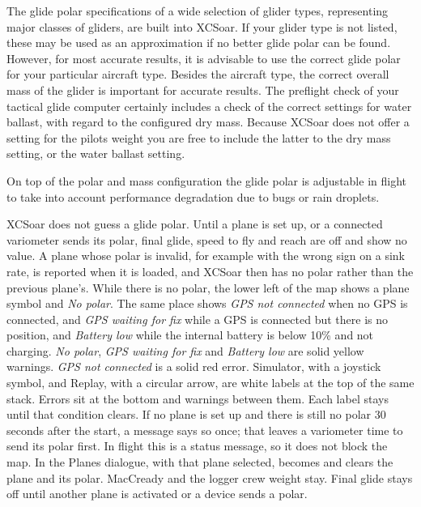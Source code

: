 The glide polar specifications of a wide selection of glider types,
representing major classes of gliders, are built into XCSoar.
If your glider type is not listed, these may be used as an approximation
if no better glide polar can be found.   However, for most 
accurate results, it is advisable to use the correct glide polar for your particular
aircraft type. 
Besides the aircraft type, the correct overall mass of the glider is important for
accurate results. 
The preflight check of your tactical glide computer certainly 
includes a check of the correct settings for water ballast, with regard to the 
configured dry mass. Because XCSoar does not offer a setting for the pilots 
weight you are free to include the latter to the dry mass setting, or the 
water ballast setting.

On top of the polar and mass configuration the glide polar is adjustable 
in flight to take into account performance degradation due to bugs or 
rain droplets.

XCSoar does not guess a glide polar.  Until a plane is set up, or a
connected variometer sends its polar, final glide, speed to fly and
reach are off and show no value.  A plane whose polar is invalid, for
example with the wrong sign on a sink rate, is reported when it is
loaded, and XCSoar then has no polar rather than the previous plane's.
While there is no polar, the lower left of the map shows a plane
symbol and \emph{No polar}.  The same place shows \emph{GPS not
connected} when no GPS is connected, and \emph{GPS waiting for
fix} while a GPS is connected but there is no position, and
\emph{Battery low} while the internal battery is below 10\% and
not charging.  \emph{No polar}, \emph{GPS waiting for fix} and
\emph{Battery low} are solid yellow warnings.  \emph{GPS not connected}
is a solid red error.  Simulator, with a joystick symbol, and Replay, with
a circular arrow, are white labels at the top of the same stack.
Errors sit at the bottom and warnings between them.  Each label
stays until that condition clears.
If no plane is set up and there is still no polar 30 seconds
after the start, a message says so once; that leaves a variometer
time to send its polar first.  In flight this is a status message, so
it does not block the map.  In the Planes dialogue, with that plane
selected,  becomes  and clears
the plane and its polar.  MacCready and the logger
crew weight stay.  Final glide stays off until another plane is
activated or a device sends a polar.

